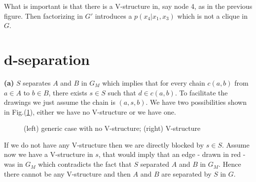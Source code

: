 \documentclass[10pt]{article}
\begin{document}
\begin{itemize}
What is important is that there is a V-structure in, say node 4, as in the previous figure. Then factorizing in $G'$ introduces a $p(x_4| x_1,x_3)$ which is not a clique in $G$.

\end{itemize}



\section{d-separation}

\textbf{(a) }$S$ separates $A$ and $B$ in $G_M$ which implies that for every chain $c(a,b)$ from $a\in A$ to $b\in B$, there exists $s\in S$ such that $d\in c(a,b)$. To facilitate the drawings we just assume the chain is $(a,s,b)$. We have two possibilities shown in Fig.(\ref{fig6}), either we have no V-structure or we have one.
\begin{figure}[h!]
\centering
{}
\caption{(left) generic case with no V-structure; (right) V-structure}
\label{fig6}
\end{figure}

If we do not have any V-structure then we are directly blocked by $s\in S$. Assume now we have a V-structure in $s$, that would imply that an edge - drawn in red - was in $G_M$ which contradicts the fact that $S$ separated $A$ and $B$ in $G_M$. Hence there cannot be any V-structure and then $A$ and $B$ are separated by $S$ in $G$.\\
\end{document}
